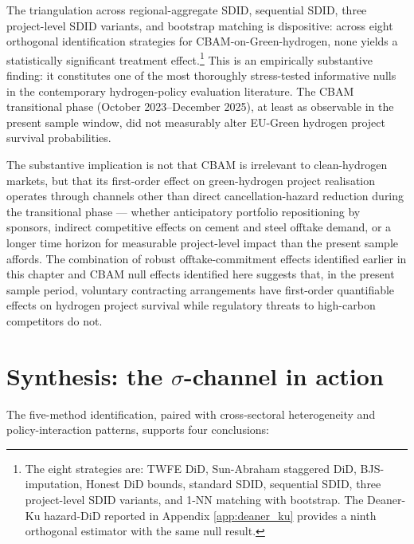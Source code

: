 The triangulation across regional-aggregate SDID, sequential SDID, three project-level SDID variants, and bootstrap matching is dispositive: across eight orthogonal identification strategies for CBAM-on-Green-hydrogen, none yields a statistically significant treatment effect.\footnote{The eight strategies are: TWFE DiD, Sun-Abraham staggered DiD, BJS-imputation, Honest DiD bounds, standard SDID, sequential SDID, three project-level SDID variants, and 1-NN matching with bootstrap. The Deaner-Ku hazard-DiD reported in Appendix \ref{app:deaner_ku} provides a ninth orthogonal estimator with the same null result.} This is an empirically substantive finding: it constitutes one of the most thoroughly stress-tested informative nulls in the contemporary hydrogen-policy evaluation literature. The CBAM transitional phase (October 2023--December 2025), at least as observable in the present sample window, did not measurably alter EU-Green hydrogen project survival probabilities.

The substantive implication is not that CBAM is irrelevant to clean-hydrogen markets, but that its first-order effect on green-hydrogen project realisation operates through channels other than direct cancellation-hazard reduction during the transitional phase --- whether anticipatory portfolio repositioning by sponsors, indirect competitive effects on cement and steel offtake demand, or a longer time horizon for measurable project-level impact than the present sample affords. The combination of robust offtake-commitment effects identified earlier in this chapter and CBAM null effects identified here suggests that, in the present sample period, voluntary contracting arrangements have first-order quantifiable effects on hydrogen project survival while regulatory threats to high-carbon competitors do not.

\section{Synthesis: the $\sigma$-channel in action}
\label{sec:offtake_synthesis}

The five-method identification, paired with cross-sectoral heterogeneity and policy-interaction patterns, supports four conclusions:


